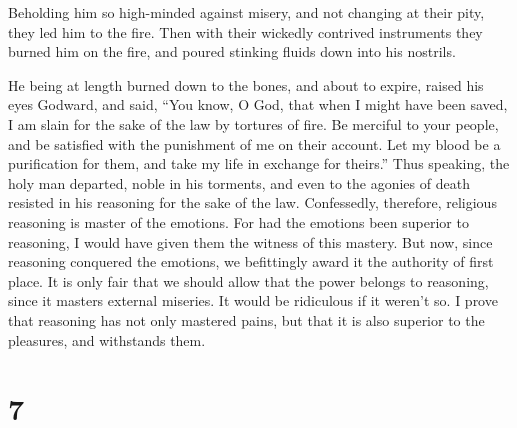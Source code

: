  Beholding him so high-minded against misery, and not
changing at their pity, they led him to the fire.  Then
with their wickedly contrived instruments they burned him on the fire,
and poured stinking fluids down into his nostrils.

 He being at length burned down to the bones, and about to
expire, raised his eyes Godward, and said,  ``You know, O
God, that when I might have been saved, I am slain for the sake of the
law by tortures of fire.  Be merciful to your people, and
be satisfied with the punishment of me on their account. 
Let my blood be a purification for them, and take my life in exchange
for theirs.''  Thus speaking, the holy man departed, noble
in his torments, and even to the agonies of death resisted in his
reasoning for the sake of the law.  Confessedly, therefore,
religious reasoning is master of the emotions.  For had the
emotions been superior to reasoning, I would have given them the witness
of this mastery.  But now, since reasoning conquered the
emotions, we befittingly award it the authority of first place.
 It is only fair that we should allow that the power
belongs to reasoning, since it masters external miseries. 
It would be ridiculous if it weren't so. I prove that reasoning has not
only mastered pains, but that it is also superior to the pleasures, and
withstands them.

\hypertarget{section-6}{%
\section{7}\label{section-6}}

